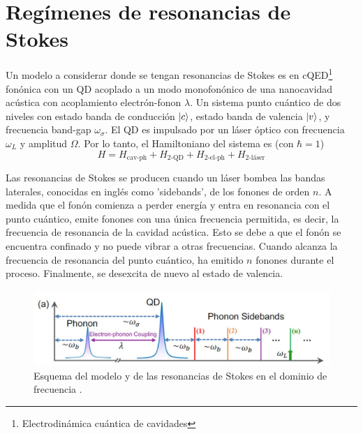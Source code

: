 \documentclass[main.tex]{subfiles}
\begin{document}
\section{Regímenes de resonancias de Stokes} \label{sec:resonancesStokes}
Un modelo a considerar donde se tengan resonancias de Stokes es en cQED\footnote{Electrodinámica cuántica de cavidades} fonónica con un QD acoplado a un modo monofonónico de una nanocavidad acústica con acoplamiento electrón-fonon $\lambda$. Un sistema punto cuántico de dos niveles con estado banda de conducción $\ket{c}$, estado banda de valencia $\ket{v}$, y frecuencia band-gap $\omega_\sigma$. El QD es impulsado por un láser óptico con frecuencia $\omega_L$ y amplitud $\Omega$. Por lo tanto, el Hamiltoniano del sistema es (con $\hbar=1$) \parencite{Bin2020}
\begin{equation}
	H = H_\text{cav-ph} + H_\text{2-QD} + H_\text{2-el-ph} + H_\text{2-láser}
\end{equation}

Las resonancias de Stokes se producen cuando un láser bombea las bandas laterales, conocidas en inglés como 'sidebands', de los fonones de orden $n$. A medida que el fonón comienza a perder energía y entra en resonancia con el punto cuántico, emite fonones con una única frecuencia permitida, es decir, la frecuencia de resonancia de la cavidad acústica. Esto se debe a que el fonón se encuentra confinado y no puede vibrar a otras frecuencias. Cuando alcanza la frecuencia de resonancia del punto cuántico, ha emitido $n$ fonones durante el proceso. Finalmente, se desexcita de nuevo al estado de valencia.

\begin{figure}[th]
	\centering
	\includegraphics[width=0.85\linewidth]{img/resonancesStokes}
	\caption{Esquema del modelo y de las resonancias de Stokes en el dominio de frecuencia \parencite{Bin2020}.}
	\label{fig:resonancesstokes}
\end{figure}
\end{document}
